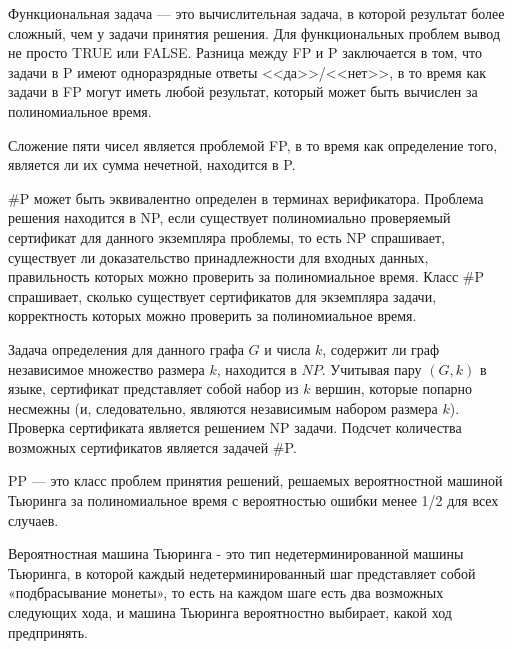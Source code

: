     \begin{Def}
        Функциональная задача --- это вычислительная задача, в которой результат более сложный, чем у задачи принятия решения. Для функциональных проблем вывод не просто TRUE или FALSE. Разница между FP и P заключается в том, что задачи в P имеют одноразрядные ответы <<да>>/<<нет>>, в то время как задачи в FP могут иметь любой результат, который может быть вычислен за полиномиальное время. 
    \end{Def}
    \begin{Example}
        Сложение пяти чисел является проблемой FP, в то время как определение того, является ли их сумма нечетной, находится в P. 
    \end{Example}
    \begin{Def}
        \#P может быть эквивалентно определен в терминах верификатора. Проблема решения находится в NP, если существует полиномиально проверяемый сертификат для данного экземпляра проблемы, то есть NP спрашивает, существует ли доказательство принадлежности для входных данных, правильность которых можно проверить за полиномиальное время. Класс \#P спрашивает, сколько существует сертификатов для экземпляра задачи, корректность которых можно проверить за полиномиальное время. 
    \end{Def}
    \begin{Example}
        Задача определения для данного графа $G$ и числа $k$, содержит ли граф независимое множество размера $k$, находится в $NP$. Учитывая пару $(G, k)$ в языке, сертификат представляет собой набор из $k$ вершин, которые попарно несмежны (и, следовательно, являются независимым набором размера $k$). Проверка сертификата является решением NP задачи. Подсчет количества возможных сертификатов является задачей \#P.
    \end{Example}
    \begin{Def}[Класс PP]
        PP — это класс проблем принятия решений, решаемых вероятностной машиной Тьюринга за полиномиальное время с вероятностью ошибки менее 1/2 для всех случаев. 
    \end{Def}
    \begin{Def}
        Вероятностная машина Тьюринга - это тип недетерминированной машины Тьюринга, в которой каждый недетерминированный шаг представляет собой «подбрасывание монеты», то есть на каждом шаге есть два возможных следующих хода, и машина Тьюринга вероятностно выбирает, какой ход предпринять. 
    \end{Def}

